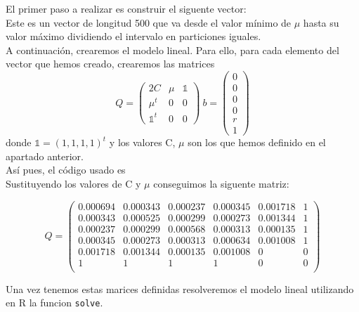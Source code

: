 \documentclass[a4paper,]{article}
\begin{document}
El primer paso a realizar es construir el siguente vector:\\
Este es un vector de longitud 500 que va desde el valor mínimo de $\mu$ hasta su valor máximo dividiendo el intervalo en particiones iguales. \\

A continuación, crearemos el modelo lineal. Para ello, para cada elemento del vector que hemos creado, crearemos las matrices
\begin{equation*} Q =
\begin{pmatrix}
2C & \mu & \mathbb{1}\\
\mu^{t} & 0 & 0\\
\mathbb{1}^{t} & 0 & 0
\end{pmatrix}
\ b = \begin{pmatrix}
0\\
0\\
0\\
0\\
r \\
1
\end{pmatrix}
\end{equation*}
donde $\mathbb{1} = (1,1,1,1)^{t}$ y los valores C, $\mu$  son los que hemos definido en el apartado anterior. \\

Así pues, el código usado es \\

Sustituyendo los valores de C y $\mu$ conseguimos la siguente matriz:

\begin{equation*} Q =
\begin{pmatrix}
0.000694 & 0.000343 & 0.000237 & 0.000345 & 0.001718 & 1\\
0.000343 & 0.000525 & 0.000299 & 0.000273 & 0.001344 & 1\\
0.000237 & 0.000299 & 	
0.000568& 0.000313 & 0.000135 & 1 \\
0.000345 & 0.000273 & 0.000313 & 0.000634 & 0.001008 & 1\\
0.001718 &  0.001344 & 0.000135 & 0.001008 & 0 & 0 \\
1 & 1 & 1 & 1 & 0 & 0\\
\end{pmatrix}
\end{equation*}

Una vez tenemos estas marices definidas resolveremos el modelo lineal utilizando en R la funcion \texttt{solve}.
\end{document}
